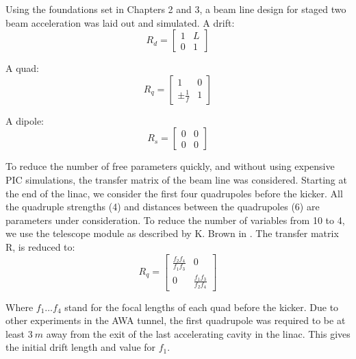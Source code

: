 Using the foundations set in Chapters 2 and 3, 
a beam line design for staged 
two beam acceleration was laid out and simulated. 
A drift: 
\begin{equation}
R_d = 
\begin{bmatrix}
1 & L \\
0 & 1
\end{bmatrix}
\end{equation}

A quad: 
\begin{equation}
R_q = 
\begin{bmatrix}
1 & 0 \\
\pm \frac{1}{f} & 1
\end{bmatrix}
\end{equation}

A dipole:
\begin{equation}
R_s = 
\begin{bmatrix}
0 & 0 \\
0 & 0
\end{bmatrix}
\end{equation}

 To reduce the number of free parameters quickly, and without using expensive PIC simulations, 
 the transfer matrix of the beam line was considered. Starting at the end of the linac, 
 we consider the first four quadrupoles before the kicker. All the quadruple strengths (4) and
 distances between the quadrupoles (6) are parameters under consideration. To reduce the number
 of variables from 10 to 4, we use the telescope module as described by K. Brown in \cite{brown}.   
 The transfer matrix R, is reduced to: 
\begin{equation}
	R_q = 
	\begin{bmatrix}
	\frac{f_2 f_4}{f_1 f_3} & 0 \\
	0 & \frac{f_1 f_3}{f_2 f_4}	
	\end{bmatrix}
\end{equation}

Where $f_1 \ldots f_4$ stand for the focal lengths of each quad before the kicker. 
Due to other experiments in the AWA tunnel, 
the first quadrupole was required to be at least $\SI{3}{m}$ away from the exit of the 
last accelerating cavity in the linac. This gives the initial drift length and value
for $f_1$. 
 
